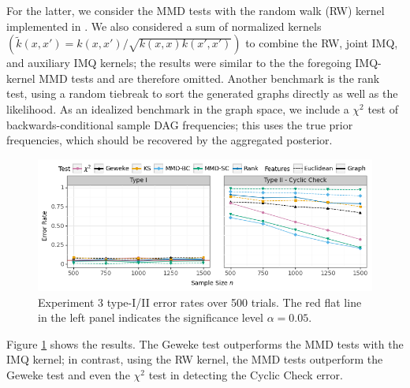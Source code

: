 \documentclass{article}
\begin{document}
For the latter, we consider the MMD tests with the random walk (RW) kernel \citep{gartner_graph_2003, vishwanathan_fast_2006} implemented in \cite{siglidis_grakel_2020}. 
We also considered a sum of normalized kernels $(\tilde{k}(x, x') = k(x, x')/\sqrt{k(x,x) k(x',x')})$ to combine the RW, joint IMQ, and auxiliary IMQ kernels; the results were similar to the the foregoing IMQ-kernel MMD tests and are therefore omitted. Another benchmark is the rank test, using a random tiebreak to sort the generated graphs directly as well as the likelihood. 
As an idealized benchmark in the graph space, we include a $\chi^{2}$ test of backwards-conditional sample DAG frequencies; this uses the true prior frequencies, which should be recovered by the aggregated posterior.
\begin{figure}[t]
    \centering
    \includegraphics[width=\textwidth]{figures/results_3.png}
    \caption{Experiment 3 type-I/II error rates over 500 trials. 
    The red flat line in the left panel indicates the significance level $\alpha=0.05$. 
    }
    \label{fig:ex3_comparison}
\end{figure}
Figure \ref{fig:ex3_comparison} shows the results. 
The Geweke test outperforms the MMD tests with the IMQ kernel; in contrast, using the RW kernel, the MMD tests outperform the Geweke test and even the $\chi^{2}$ test in detecting the Cyclic Check error. 
\end{document}
